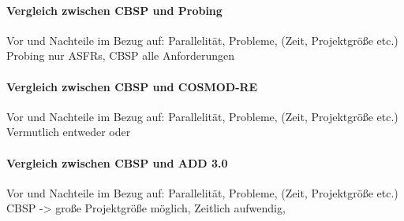 \paragraph{Vergleich zwischen CBSP und Probing}
Vor und Nachteile im Bezug auf: Parallelität, Probleme, (Zeit, Projektgröße etc.)\\

Probing nur ASFRs, CBSP alle Anforderungen \\

\paragraph{Vergleich zwischen CBSP und COSMOD-RE}
Vor und Nachteile im Bezug auf: Parallelität, Probleme, (Zeit, Projektgröße etc.)\\

Vermutlich entweder oder \\

\paragraph{Vergleich zwischen CBSP und ADD 3.0}
Vor und Nachteile im Bezug auf: Parallelität, Probleme, (Zeit, Projektgröße etc.)\\

CBSP -> große Projektgröße möglich, Zeitlich aufwendig, 